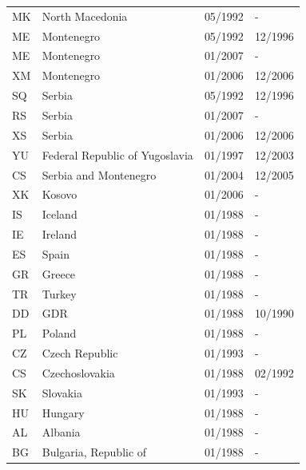 \begin{small}
\begin{longtable}{p{0.5cm}p{9cm}p{2cm}p{2cm}}
MK	&	North Macedonia	&	05/1992	&	-	\\

ME	&	Montenegro	&	05/1992	&	12/1996	\\

ME	&	Montenegro	&	01/2007	&	-	\\

XM	&	Montenegro	&	01/2006	&	12/2006	\\

SQ	&	Serbia	&	05/1992	&	12/1996	\\

RS	&	Serbia	&	01/2007	&	-	\\

XS	&	Serbia	&	01/2006	&	12/2006	\\

YU	&	Federal Republic of Yugoslavia	&	01/1997	&	12/2003	\\

CS	&	Serbia and Montenegro	&	01/2004	&	12/2005	\\

XK	&	Kosovo	&	01/2006	&	-	\\

IS	&	Iceland	&	01/1988	&	-	\\

IE	&	Ireland	&	01/1988	&	-	\\

ES	&	Spain	&	01/1988	&	-	\\

GR	&	Greece	&	01/1988	&	-	\\

TR	&	Turkey	&	01/1988	&	-	\\

DD	&	GDR	&	01/1988	&	10/1990	\\

PL	&	Poland	&	01/1988	&	-	\\

CZ	&	Czech Republic	&	01/1993	&	-	\\

CS	&	Czechoslovakia	&	01/1988	&	02/1992	\\

SK	&	Slovakia	&	01/1993	&	-	\\

HU	&	Hungary	&	01/1988	&	-	\\

AL	&	Albania	&	01/1988	&	-	\\

BG	&	Bulgaria, Republic of	&	01/1988	&	-	\\


\end{longtable}
\end{small}
